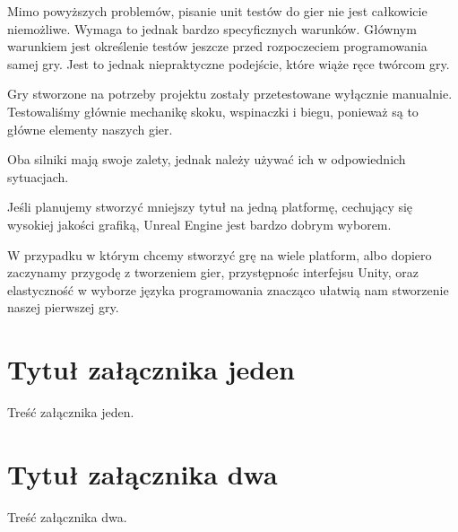 \documentclass[12pt]{xmgr}
\begin{document}
Mimo powyższych problemów, pisanie unit testów do gier nie jest całkowicie niemożliwe. Wymaga to jednak bardzo specyficznych warunków. Głównym warunkiem jest określenie testów jeszcze przed rozpoczeciem programowania samej gry. Jest to jednak niepraktyczne podejście, które wiąże ręce twórcom gry.

Gry stworzone na potrzeby projektu zostały przetestowane wyłącznie manualnie. Testowaliśmy głównie mechanikę skoku, wspinaczki i biegu, ponieważ są to główne elementy naszych gier.


\summary
Oba silniki mają swoje zalety, jednak należy używać ich w odpowiednich sytuacjach.

Jeśli planujemy stworzyć mniejszy tytuł na jedną platformę, cechujący się wysokiej jakości grafiką, Unreal Engine jest bardzo dobrym wyborem.

W przypadku w którym chcemy stworzyć grę na wiele platform, albo dopiero zaczynamy przygodę z tworzeniem gier, przystępnośc interfejsu Unity, oraz elastyczność w wyborze języka programowania znacząco ułatwią nam stworzenie naszej pierwszej gry.

\appendix
\chapter{Tytuł załącznika jeden}

Treść załącznika jeden.

\chapter{Tytuł załącznika dwa}

Treść załącznika dwa.


\nocite{*}



\listoftables

\listoffigures

\oswiadczenie
\end{document}
